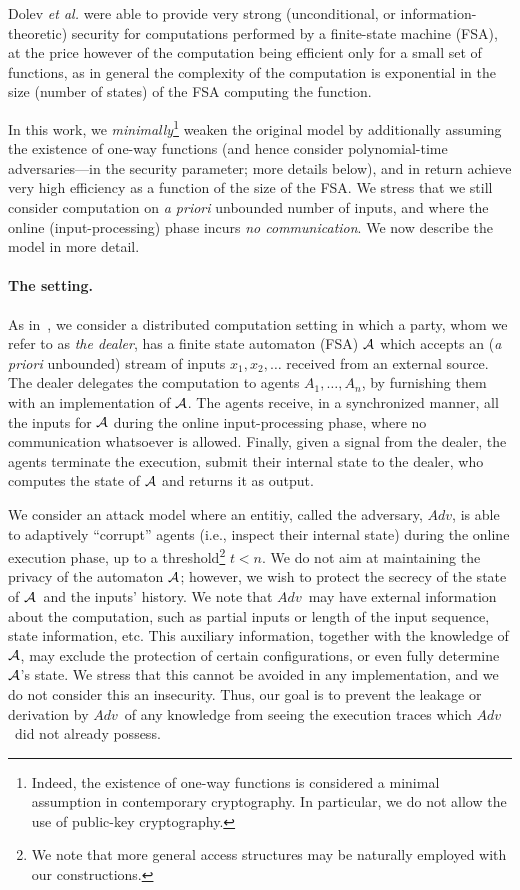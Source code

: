 \documentclass[letterpaper,11pt]{article}
\newcommand{\Ad}{$Adv$}
\newcommand{\A}{$\cal A$}
\begin{document}
Dolev {\em et al.}
were able to provide very strong (unconditional, or information-theoretic)
security for computations performed by a finite-state machine (FSA),
at the price however of the computation being efficient only for a small
set of functions, as in general the complexity of the computation
is exponential in the size (number of states) of the FSA computing
the function.


In this work, we {\em minimally}\footnote{Indeed, the existence
of one-way functions is considered a minimal assumption in contemporary
cryptography. In particular, we do not allow the use of public-key 
cryptography.}
weaken the original model by
additionally assuming the existence of one-way functions (and hence
consider polynomial-time adversaries---in the security parameter; more
details below), and in return achieve very high efficiency as a
function of the size of the FSA.  We stress that we still consider
computation on {\em a priori} unbounded number of inputs, and
where the online (input-processing) phase incurs {\em no communication}.
We now describe the model in more detail.


\vspace{-.1in}
\paragraph{The setting.}
As in~\cite{DGGK11}, we consider a distributed computation setting in
which a party, whom we refer to as {\it the dealer}, has a finite
state automaton (FSA) ${\cal A}$ which accepts an ({\em a priori}
unbounded) stream of inputs $x_1, x_2, \ldots$ received from an
external source. The dealer delegates the computation to agents
$A_1,\ldots, A_n$, by furnishing them with an implementation of \A.
The agents receive, in a synchronized manner, all
the inputs for ${\cal A}$ during the online input-processing phase,
where no communication whatsoever is allowed.  Finally, given a signal
from the dealer, the agents terminate the execution, submit their 
 internal state to the dealer, who computes the  state of ${\cal A}$  and returns it as output.

We consider an attack model where an entitiy,
called the adversary, \Ad, is able to adaptively ``corrupt'' agents
(i.e., inspect their internal state) during the online execution
phase, up to a threshold\footnote{We note that more general access 
structures may be naturally employed with our constructions.} 
$t < n$.  We do not aim at maintaining the privacy of the
automaton \A; however, we wish to protect the secrecy of the state of
\A\ and the inputs' history.  We note that \Ad\ may have external
information about the computation, such as partial inputs or length of
the input sequence, state information, etc.  This auxiliary
information, together with the knowledge of \A, may exclude the
protection of certain configurations, or even fully determine \A's
state.  We stress that this cannot be avoided in any implementation,
and we do not consider this an insecurity.  Thus, our goal is to
prevent the leakage or derivation by
\Ad\ of any knowledge from seeing the execution traces which \Ad\ did
not already possess.
\end{document}
